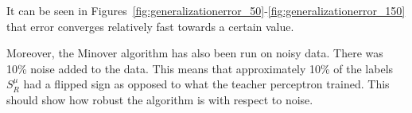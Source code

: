 It can be seen in Figures~\ref{fig:generalizationerror_50}-\ref{fig:generalizationerror_150} that error converges relatively fast towards a certain value.

Moreover, the Minover algorithm has also been run on noisy data.
There was 10\% noise added to the data.
This means that approximately 10\% of the labels $S^{\mu}_R$ had a flipped sign as opposed to what the teacher perceptron trained.
This should show how robust the algorithm is with respect to noise.

